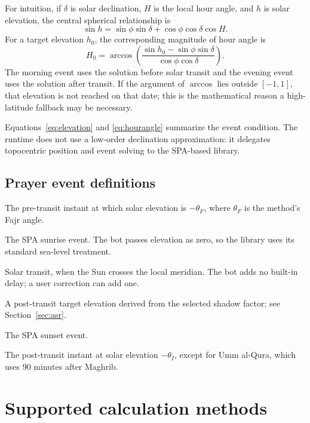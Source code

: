 \documentclass[11pt,a4paper]{article}
\begin{document}
For intuition, if $\delta$ is solar declination, $H$ is the local hour angle, and $h$ is solar elevation, the central spherical relationship is
\begin{equation}
  \sin h = \sin\phi\sin\delta + \cos\phi\cos\delta\cos H.
  \label{eq:elevation}
\end{equation}
For a target elevation $h_0$, the corresponding magnitude of hour angle is
\begin{equation}
  H_0 = \arccos\!\left(
    \frac{\sin h_0-\sin\phi\sin\delta}{\cos\phi\cos\delta}
  \right).
  \label{eq:hourangle}
\end{equation}
The morning event uses the solution before solar transit and the evening event uses the solution after transit. If the argument of $\arccos$ lies outside $[-1,1]$, that elevation is not reached on that date; this is the mathematical reason a high-latitude fallback may be necessary.

Equations~\ref{eq:elevation} and \ref{eq:hourangle} summarize the event condition. The runtime does not use a low-order declination approximation: it delegates topocentric position and event solving to the SPA-based library.

\subsection{Prayer event definitions}

\begin{description}[style=nextline,leftmargin=0pt]
  \item[Fajr] The pre-transit instant at which solar elevation is $-\theta_F$, where $\theta_F$ is the method's Fajr angle.
  \item[Sunrise] The SPA sunrise event. The bot passes elevation as zero, so the library uses its standard sea-level treatment.
  \item[Dhuhr] Solar transit, when the Sun crosses the local meridian. The bot adds no built-in delay; a user correction can add one.
  \item[Asr] A post-transit target elevation derived from the selected shadow factor; see Section~\ref{sec:asr}.
  \item[Maghrib] The SPA sunset event.
  \item[Isha] The post-transit instant at solar elevation $-\theta_I$, except for Umm al-Qura, which uses 90 minutes after Maghrib.
\end{description}

\section{Supported calculation methods}
\end{document}
